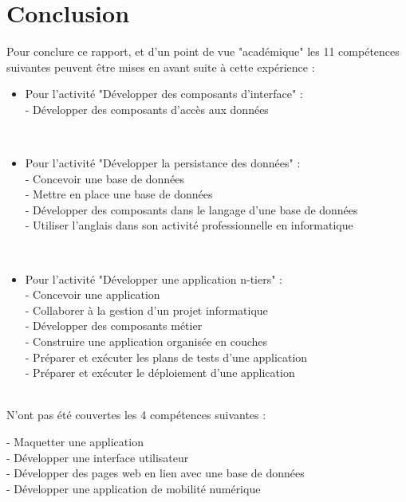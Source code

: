 \chapter{Conclusion}
\label{Conclusion}

Pour conclure ce rapport, et d'un point de vue "académique" les 11 compétences suivantes peuvent être mises en avant suite à cette expérience :
\renewcommand{\labelitemi}{\textbullet}
\\
\begin{itemize}
\item Pour l'activité "Développer des composants d'interface" :\\
- Développer des composants d'accès aux données\\
\end{itemize}
\\
\begin{itemize}
\item Pour l'activité "Développer la persistance des données" :\\
- Concevoir une base de données\\
- Mettre en place une base de données\\
- Développer des composants dans le langage d'une base de données \\
- Utiliser l'anglais dans son activité professionnelle en informatique\\
\end{itemize}
\\
\begin{itemize}
\item Pour l'activité "Développer une application n-tiers" :\\
- Concevoir une application\\
- Collaborer à la gestion d'un projet informatique\\
- Développer des composants métier\\
- Construire une application organisée en couches\\
- Préparer et exécuter les plans de tests d'une application\\
- Préparer et exécuter le déploiement d'une application\\
\end{itemize}
\\
N'ont pas été couvertes les 4 compétences suivantes :
\begin{itemize}
- Maquetter une application \\
- Développer une interface utilisateur \\
- Développer des pages web en lien avec une base de données \\
- Développer une application de mobilité numérique \\
\end{itemize}
